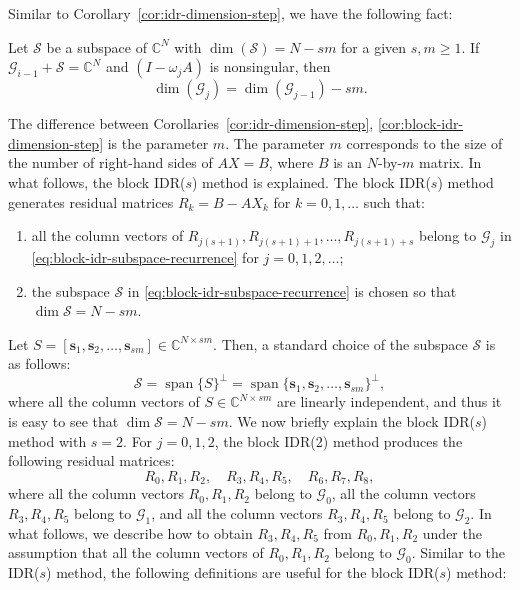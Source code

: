 {Similar to Corollary\ \ref{cor:idr-dimension-step}, we have the following fact:}
\par{}
\begin{Corollary}\label{cor:block-idr-dimension-step}
{Let $\mathcal S$ be a subspace of $\mathbb C^N$ with $\dim(\mathcal S)=N-sm$ for a given $s,m\ge1$. If $\mathcal G_{i-1}+\mathcal S=\mathbb C^N$ and $(I-\omega_jA)$ is nonsingular, then}
\[\dim(\mathcal G_j)=\dim(\mathcal G_{j-1})-sm.\]
\end{Corollary}
{The difference between Corollaries\ \ref{cor:idr-dimension-step}, \ref{cor:block-idr-dimension-step} is the parameter $m$. The parameter $m$ corresponds to the size of the number of right-hand sides of $AX=B$, where $B$ is an $N$-by-$m$ matrix.}
{In what follows, the block IDR($s$) method is explained. The block IDR($s$) method generates residual matrices $R_k=B-AX_k$ for $k=0,1,\ldots$ such that:}
\begin{enumerate}
\item{all the column vectors of $R_{j(s+1)},R_{j(s+1)+1},\ldots,R_{j(s+1)+s}$ belong to $\mathcal G_j$ in \eqref{eq:block-idr-subspace-recurrence} for $j=0,1,2,\ldots$;}
\item{the subspace $\mathcal S$ in \eqref{eq:block-idr-subspace-recurrence} is chosen so that $\dim\mathcal S=N-sm$.}
\end{enumerate}
{Let $S=[\bm s_1,\bm s_2,\ldots,\bm s_{sm}]\in\mathbb C^{N\times sm}$. Then, a standard choice of the subspace $\mathcal S$ is as follows:}
\[\mathcal S=\operatorname{span}\{S\}^{\perp}=\operatorname{span}\{\bm s_1,\bm s_2,\ldots,\bm s_{sm}\}^{\perp},\]
{where all the column vectors of $S\in\mathbb C^{N\times sm}$ are linearly independent, and thus it is easy to see that $\dim\mathcal S=N-sm$.}
{We now briefly explain the block IDR($s$) method with $s=2$. For $j=0,1,2$, the block IDR(2) method produces the following residual matrices:}
\[R_0,R_1,R_2,\quad R_3,R_4,R_5,\quad R_6,R_7,R_8,\]
{where all the column vectors $R_0,R_1,R_2$ belong to $\mathcal G_0$, all the column vectors $R_3,R_4,R_5$ belong to $\mathcal G_1$, and all the column vectors $R_3,R_4,R_5$ belong to $\mathcal G_2$.}
{In what follows, we describe how to obtain $R_3,R_4,R_5$ from $R_0,R_1,R_2$ under the assumption that all the column vectors of $R_0,R_1,R_2$ belong to $\mathcal G_0$. Similar to the IDR($s$) method, the following definitions are useful for the block IDR($s$) method:}
